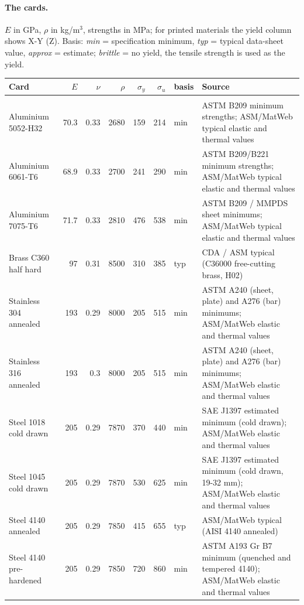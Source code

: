 \paragraph{The cards.} $E$ in GPa, $\rho$ in kg/m$^3$, strengths in MPa; for printed materials the yield column shows
X-Y (Z). Basis: \emph{min} = specification minimum, \emph{typ} = typical data-sheet value, \emph{approx} = estimate;
\emph{brittle} = no yield, the tensile strength is used as the yield.

\begin{center}
\scriptsize
\begin{tabularx}{\linewidth}{@{}>{\raggedright\arraybackslash}p{2.75cm}rrrrrlX@{}}
\toprule
Card & $E$ & $\nu$ & $\rho$ & $\sigma_y$ & $\sigma_u$ & basis & Source\\
\midrule
\multicolumn{8}{@{}l}{\textit{Metals}}\\
Aluminium 5052-H32 & 70.3 & 0.33 & 2680 & 159 & 214 & min & ASTM B209 minimum strengths; ASM/MatWeb typical elastic and thermal values\\
Aluminium 6061-T6 & 68.9 & 0.33 & 2700 & 241 & 290 & min & ASTM B209/B221 minimum strengths; ASM/MatWeb typical elastic and thermal values\\
Aluminium 7075-T6 & 71.7 & 0.33 & 2810 & 476 & 538 & min & ASTM B209 / MMPDS sheet minimums; ASM/MatWeb typical elastic and thermal values\\
Brass C360 half hard & 97 & 0.31 & 8500 & 310 & 385 & typ & CDA / ASM typical (C36000 free-cutting brass, H02)\\
Stainless 304 annealed & 193 & 0.29 & 8000 & 205 & 515 & min & ASTM A240 (sheet, plate) and A276 (bar) minimums; ASM/MatWeb elastic and thermal values\\
Stainless 316 annealed & 193 & 0.3 & 8000 & 205 & 515 & min & ASTM A240 (sheet, plate) and A276 (bar) minimums; ASM/MatWeb elastic and thermal values\\
Steel 1018 cold drawn & 205 & 0.29 & 7870 & 370 & 440 & min & SAE J1397 estimated minimum (cold drawn); ASM/MatWeb elastic and thermal values\\
Steel 1045 cold drawn & 205 & 0.29 & 7870 & 530 & 625 & min & SAE J1397 estimated minimum (cold drawn, 19-32 mm); ASM/MatWeb elastic and thermal values\\
Steel 4140 annealed & 205 & 0.29 & 7850 & 415 & 655 & typ & ASM/MatWeb typical (AISI 4140 annealed)\\
Steel 4140 pre-hardened & 205 & 0.29 & 7850 & 720 & 860 & min & ASTM A193 Gr B7 minimum (quenched and tempered 4140); ASM/MatWeb elastic and thermal values\\

\end{tabularx}
\end{center}
